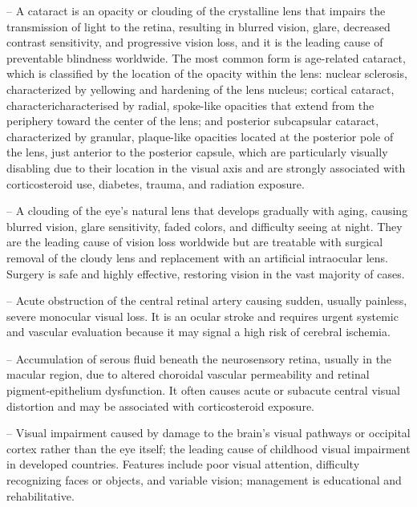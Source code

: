 -- A cataract is an opacity or clouding of the crystalline lens that impairs the transmission of light to the retina, resulting in blurred vision, glare, decreased contrast sensitivity, and progressive vision loss, and it is the leading cause of preventable blindness worldwide. The most common form is age-related cataract, which is classified by the location of the opacity within the lens: nuclear sclerosis, characterized by yellowing and hardening of the lens nucleus; cortical cataract, charactericharacterised by radial, spoke-like opacities that extend from the periphery toward the center of the lens; and posterior subcapsular cataract, characterized by granular, plaque-like opacities located at the posterior pole of the lens, just anterior to the posterior capsule, which are particularly visually disabling due to their location in the visual axis and are strongly associated with corticosteroid use, diabetes, trauma, and radiation exposure.

-- A clouding of the eye's natural lens that develops gradually with aging, causing blurred vision, glare sensitivity, faded colors, and difficulty seeing at night. They are the leading cause of vision loss worldwide but are treatable with surgical removal of the cloudy lens and replacement with an artificial intraocular lens. Surgery is safe and highly effective, restoring vision in the vast majority of cases.

-- Acute obstruction of the central retinal artery causing sudden, usually painless, severe monocular visual loss. It is an ocular stroke and requires urgent systemic and vascular evaluation because it may signal a high risk of cerebral ischemia.

-- Accumulation of serous fluid beneath the neurosensory retina, usually in the macular region, due to altered choroidal vascular permeability and retinal pigment-epithelium dysfunction. It often causes acute or subacute central visual distortion and may be associated with corticosteroid exposure.

-- Visual impairment caused by damage to the brain's visual pathways or occipital cortex rather than the eye itself; the leading cause of childhood visual impairment in developed countries. Features include poor visual attention, difficulty recognizing faces or objects, and variable vision; management is educational and rehabilitative.

